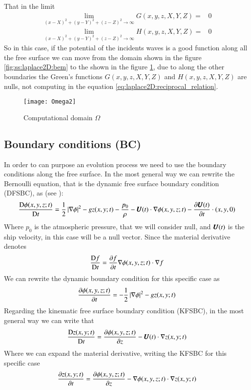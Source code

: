 %
That in the limit
%
\begin{eqnarray}
	\label{eq:laplace3D:limit_g}
	\lim_{(x-X)^2 + (y-Y)^2 + (z-Z)^2 \to \infty} G(x,y,z,X,Y,Z) = & 0
	\\
	\label{eq:laplace3D:limit_h}
	\lim_{(x-X)^2 + (y-Y)^2 + (z-Z)^2 \to \infty} H(x,y,z,X,Y,Z) = & 0
\end{eqnarray}
%
So in this case, if the potential of the incidents waves is
a good function along all the free surface we can move from
the domain shown in the figure \ref{fig:ss:laplace2D:bem} to
the shown in the figure \ref{fig:ss:laplace3D:bem}, due to
along the other boundaries the Green's functions $G(x,y,z,X,Y,Z)$
and $H(x,y,z,X,Y,Z)$ are nulls, not computing in the equation
\ref{eq:laplace2D:reciprocal_relation}.
%
\begin{figure}[ht!]
  \centering
  \texttt{[image: Omega2]}
  \caption{Computational domain $\Omega$}
  \label{fig:ss:laplace3D:bem}
\end{figure}
%
\subsection{Boundary conditions (BC)}
\label{sss:laplace3D:BC}
%
In order to can purpose an evolution process we need to use
the boundary conditions along the free surface. In the most
general way we can rewrite the Bernoulli equation, that is
the dynamic free surface boundary condition (DFSBC), as (see
\citep{yang2004}):
%
\begin{eqnarray}
	\label{eq:laplace3D:FS_Bernoulli}
	\frac{\mbox{D} \phi(x,y,z;t)}{\mbox{D} t} =
		\frac{1}{2}\left\vert \gradient \phi \right\vert^2
		- g z(x,y;t)
		- \frac{p_0}{\rho}
		- \bs{U}(t) \cdot \gradient \phi(x,y,z;t)
		- \frac{\partial \bs{U}(t)}{\partial t} \cdot (x,y,0)
\end{eqnarray}
%
Where $p_0$ is the atmospheric pressure, that we will consider
null, and $\bs{U}(t)$ is the ship velocity, in this case will be
a null vector. Since the material derivative denotes
%
\begin{eqnarray*}
	\frac{\mbox{D} f}{\mbox{D} t} =
		\frac{\partial f}{\partial t}
		\gradient{\phi(x,y,z;t)} \cdot \gradient{f}
\end{eqnarray*}
%
We can rewrite the dynamic boundary condition for this specific case as
%
\begin{eqnarray}
	\label{eq:laplace3D:DFSBC}
	\frac{\partial \phi(x,y,z;t)}{\partial t} =
		- \frac{1}{2}\left\vert \gradient \phi \right\vert^2
		- g z(x,y;t)
\end{eqnarray}
%
Regarding the kinematic free surface boundary condition (KFSBC), in the
most general way we can write that
%
\begin{eqnarray}
	\label{eq:laplace3D:FS_Kinematic}
	\frac{\mbox{D} z(x,y;t)}{\mbox{D} t} =
		\frac{\partial \phi(x,y,z;t)}{\partial z}
		- \bs{U}(t) \cdot \gradient z(x,y;t)
\end{eqnarray}
%
Where we can expand the material derivative, writing the KFSBC for this
specific case
%
\begin{eqnarray}
	\label{eq:laplace3D:KFSBC}
	\frac{\partial z(x,y;t)}{\partial t} =
		\frac{\partial \phi(x,y,z;t)}{\partial z}
		- \gradient{\phi(x,y,z;t)} \cdot \gradient{z(x,y;t)}
\end{eqnarray}
%
